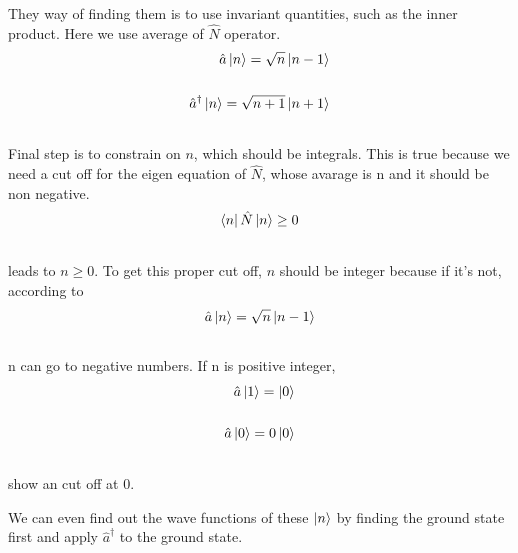 \documentclass[letterpaper,10pt,english]{sphinxmanual}
\begin{document}
They way of finding them is to use invariant quantities, such as the inner product. Here we use average of $\hat N$ operator.
\begin{gather}
\begin{split}\hat a \ket{n} = \sqrt n \ket{n-1}  \\\\
\hat a^\dagger \ket{n} = \sqrt{n+1} \ket{n+1}\end{split}\notag\\\begin{split}\end{split}\notag
\end{gather}
Final step is to constrain on $n$, which should be integrals. This is true because we need a cut off for the eigen equation of $\hat N$, whose avarage is n and it should be non negative.
\begin{gather}
\begin{split}\bra{n}\hat N \ket{n} \ge 0\end{split}\notag\\\begin{split}\end{split}\notag
\end{gather}
leads to $n\ge 0$. To get this proper cut off, $n$ should be integer because if it's not, according to
\begin{gather}
\begin{split}\hat a \ket{n} = \sqrt n \ket{n-1}\end{split}\notag\\\begin{split}\end{split}\notag
\end{gather}
n can go to negative numbers. If n is positive integer,
\begin{gather}
\begin{split}\hat a \ket{1} = \ket{0}  \\\\
\hat a \ket{0} = 0 \ket{0}\end{split}\notag\\\begin{split}\end{split}\notag
\end{gather}
show an cut off at 0.

We can even find out the wave functions of these $\ket{n}$ by finding the ground state first and apply $\hat a^\dagger$ to the ground state.
\end{document}
